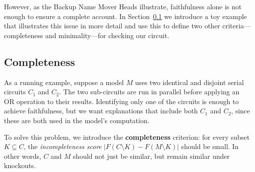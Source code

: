 However, as the Backup Name Mover Heads illustrate, faithfulness alone is not enough to ensure a complete account. In Section~\ref{sec:completeness} we introduce a toy example that illustrates this issue in more detail and use this to define two other criteria---completeness and minimality---for checking our circuit.





\subsection{Completeness}
\label{sec:completeness}


As a running example, suppose a model $M$ uses two identical and disjoint serial circuits $C_1$ and $C_2$. The two sub-circuits are run in parallel before applying an OR operation to their results. Identifying only one of the circuits is enough to achieve faithfulness, but we want explanations that include both $C_1$ and $C_2$, since these are both used in the model's computation.


To solve this problem, we introduce the \textbf{completeness} criterion: for every subset $K \subseteq C$, the \emph{incompleteness score} $|F(C \setminus K) - F(M\setminus K)|$ should be small. In other words, $C$ and $M$ should not just be similar, but remain similar under knockouts. 

